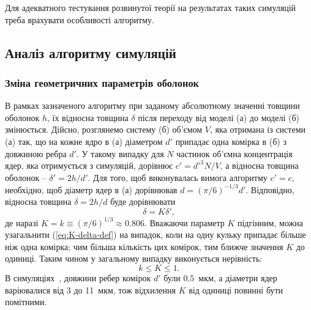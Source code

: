 \documentclass[14pt,twoside]{vakthesis}
\begin{document}
Для адекватного тестування розвинутої теорії на результатах 
таких симуляцій треба врахувати особливості алгоритму. 


\subsection{Аналіз алгоритму симуляцій}
\subsubsection{Зміна геометричних параметрів оболонок}

В рамках зазначеного алгоритму при заданому абсолютному значенні товщини оболонок $h$, їх відносна товщина $\delta$ після переходу від моделі (а) до моделі (б) змінюється. Дійсно, розглянемо систему (б) об'ємом $V$, яка отримана із системи (а) так, що на кожне ядро в (а) діаметром $d'$ припадає одна комірка в (б) з довжиною ребра $d'$. У такому випадку для $N$ частинок об'ємна концентрація ядер, яка отримується з симуляцій, дорівнює $c' = d'^3 N/V$, а відносна товщина оболонок -- $\delta' = 2h/d'$. 
Для того, щоб виконувалась вимога алгоритму $c' = c$, необхідно, щоб діаметр ядер в (а) дорівнював $d = (\pi/6)^{-1/3} d'$. 
Відповідно, відносна товщина $\delta = 2h/d$ буде дорівнювати
\begin{equation}\label{eq:K-delta-def}
\delta = K \delta',
\end{equation}
де наразі $K = k \equiv (\pi/6)^{1/3} \approx 0.806$. Вважаючи параметр $K$ підгінним, можна узагальнити (\ref{eq:K-delta-def}) на випадок, коли на одну кульку припадає більше ніж одна комірка; чим більша кількість цих комірок, тим ближче значення $K$ до одиниці. Таким чином у загальному випадку виконується нерівність:
\begin{equation}\label{eq:K-delta-ineq}
k \leq K \leq 1 .%
\end{equation}
В симуляціях~\cite{Siekierski2005, Siekierski2006, Siekierski2007}, довжини ребер комірок $d'$ були $0.5$~мкм, а діаметри ядер варіювалися від 3 до 11~мкм, тож відхилення $K$ від одиниці повинні бути помітними. 
\end{document}
